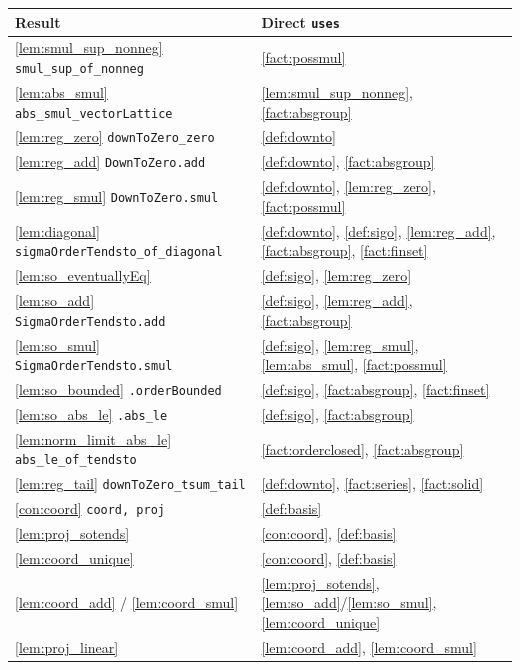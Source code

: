 \documentclass[11pt]{article}
\theoremstyle{definition}
\theoremstyle{plain}
\theoremstyle{remark}
\begin{document}
\begin{center}
\small
\begin{tabular}{ll}
\toprule
Result & Direct \texttt{uses} \\
\midrule
\ref{lem:smul_sup_nonneg} \texttt{smul\_sup\_of\_nonneg} & \ref{fact:possmul} \\
\ref{lem:abs_smul} \texttt{abs\_smul\_vectorLattice} & \ref{lem:smul_sup_nonneg}, \ref{fact:absgroup} \\
\ref{lem:reg_zero} \texttt{downToZero\_zero} & \ref{def:downto} \\
\ref{lem:reg_add} \texttt{DownToZero.add} & \ref{def:downto}, \ref{fact:absgroup} \\
\ref{lem:reg_smul} \texttt{DownToZero.smul} & \ref{def:downto}, \ref{lem:reg_zero}, \ref{fact:possmul} \\
\ref{lem:diagonal} \texttt{sigmaOrderTendsto\_of\_diagonal} & \ref{def:downto}, \ref{def:sigo}, \ref{lem:reg_add}, \ref{fact:absgroup}, \ref{fact:finset} \\
\ref{lem:so_eventuallyEq} & \ref{def:sigo}, \ref{lem:reg_zero} \\
\ref{lem:so_add} \texttt{SigmaOrderTendsto.add} & \ref{def:sigo}, \ref{lem:reg_add}, \ref{fact:absgroup} \\
\ref{lem:so_smul} \texttt{SigmaOrderTendsto.smul} & \ref{def:sigo}, \ref{lem:reg_smul}, \ref{lem:abs_smul}, \ref{fact:possmul} \\
\ref{lem:so_bounded} \texttt{.orderBounded} & \ref{def:sigo}, \ref{fact:absgroup}, \ref{fact:finset} \\
\ref{lem:so_abs_le} \texttt{.abs\_le} & \ref{def:sigo}, \ref{fact:absgroup} \\
\ref{lem:norm_limit_abs_le} \texttt{abs\_le\_of\_tendsto} & \ref{fact:orderclosed}, \ref{fact:absgroup} \\
\ref{lem:reg_tail} \texttt{downToZero\_tsum\_tail} & \ref{def:downto}, \ref{fact:series}, \ref{fact:solid} \\
\ref{con:coord} \texttt{coord, proj} & \ref{def:basis} \\
\ref{lem:proj_sotends} & \ref{con:coord}, \ref{def:basis} \\
\ref{lem:coord_unique} & \ref{con:coord}, \ref{def:basis} \\
\ref{lem:coord_add} / \ref{lem:coord_smul} & \ref{lem:proj_sotends}, \ref{lem:so_add}/\ref{lem:so_smul}, \ref{lem:coord_unique} \\
\ref{lem:proj_linear} & \ref{lem:coord_add}, \ref{lem:coord_smul} \\

\end{tabular}
\end{center}
\end{document}
